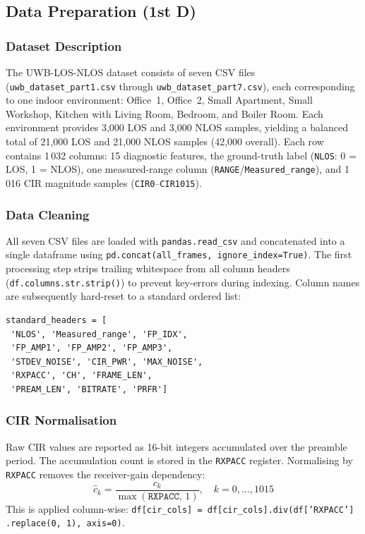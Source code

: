 \documentclass[conference]{IEEEtran}
\begin{document}
\subsection{Data Preparation (1st D)}

\subsubsection{Dataset Description}
The UWB-LOS-NLOS dataset \cite{bregar2018improving} consists of seven CSV files
(\texttt{uwb\_dataset\_part1.csv} through \texttt{uwb\_dataset\_part7.csv}), each
corresponding to one indoor environment: Office~1, Office~2, Small Apartment, Small
Workshop, Kitchen with Living Room, Bedroom, and Boiler Room. Each environment
provides 3{,}000 LOS and 3{,}000 NLOS samples, yielding a balanced total of
21{,}000 LOS and 21{,}000 NLOS samples (42{,}000 overall). Each row contains 1\,032
columns: 15 diagnostic features, the ground-truth label (\texttt{NLOS}: 0 = LOS,
1 = NLOS), one measured-range column (\texttt{RANGE}/\texttt{Measured\_range}), and
1\,016 CIR magnitude samples (\texttt{CIR0}--\texttt{CIR1015}).

\subsubsection{Data Cleaning}
All seven CSV files are loaded with \texttt{pandas.read\_csv} and concatenated into a
single dataframe using \texttt{pd.concat(all\_frames, ignore\_index=True)}. The first
processing step strips trailing whitespace from all column headers
(\texttt{df.columns.str.strip()}) to prevent key-errors during indexing. Column names
are subsequently hard-reset to a standard ordered list:

\begin{verbatim}
standard_headers = [
 'NLOS', 'Measured_range', 'FP_IDX',
 'FP_AMP1', 'FP_AMP2', 'FP_AMP3',
 'STDEV_NOISE', 'CIR_PWR', 'MAX_NOISE',
 'RXPACC', 'CH', 'FRAME_LEN',
 'PREAM_LEN', 'BITRATE', 'PRFR']
\end{verbatim}

\subsubsection{CIR Normalisation}
Raw CIR values are reported as 16-bit integers accumulated over the preamble period.
The accumulation count is stored in the \texttt{RXPACC} register. Normalising by
\texttt{RXPACC} removes the receiver-gain dependency:
\begin{equation}
  \hat{c}_{k} = \frac{c_{k}}{\max(\texttt{RXPACC},\, 1)}, \quad k = 0,\ldots,1015
\end{equation}
This is applied column-wise: \texttt{df[cir\_cols] = df[cir\_cols].div(df['RXPACC']\\.replace(0,~1),~axis=0)}.
\end{document}
